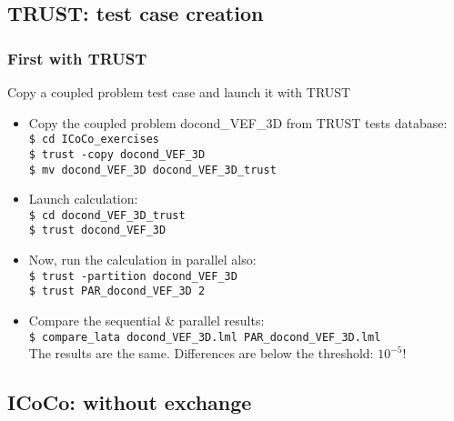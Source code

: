 \documentclass[10pt, hyperref={unicode=true,pdfusetitle, bookmarks=true,bookmarksnumbered=false,bookmarksopen=false, breaklinks=false,pdfborder={0 0 1},backref=true,colorlinks=true,linkcolor=darkblue,pageanchor, urlcolor=darkblue}]{beamer}
\begin{document}
\subsection{{\bf{TRUST: test case creation}}}
\begin{frame}
\end{frame}
\begin{frame}
\frametitle{First with TRUST}

\begin{block}{Copy a coupled problem test case and launch it with TRUST}
\begin{itemize}
\item Copy the coupled problem docond\_VEF\_3D from TRUST tests database:\\
\texttt{\$ cd ICoCo\_exercises}\\
\texttt{\$ trust -copy docond\_VEF\_3D}\\
\texttt{\$ mv docond\_VEF\_3D docond\_VEF\_3D\_trust}
\item Launch calculation:\\
\texttt{\$ cd docond\_VEF\_3D\_trust}\\
\texttt{\$ trust docond\_VEF\_3D}
\item Now, run the calculation in parallel also:\\
\texttt{\$ trust -partition docond\_VEF\_3D}\\
\texttt{\$ trust PAR\_docond\_VEF\_3D 2}\\
\item Compare the sequential \& parallel results:\\
\texttt{\$ compare\_lata docond\_VEF\_3D.lml PAR\_docond\_VEF\_3D.lml}\\
The results are the same. Differences are below the threshold: $10^{-5}$!
\end{itemize}
\end{block}

\end{frame}
\subsection{{\bf{ICoCo: without exchange}}}
\begin{frame}
\end{frame}
\end{document}
